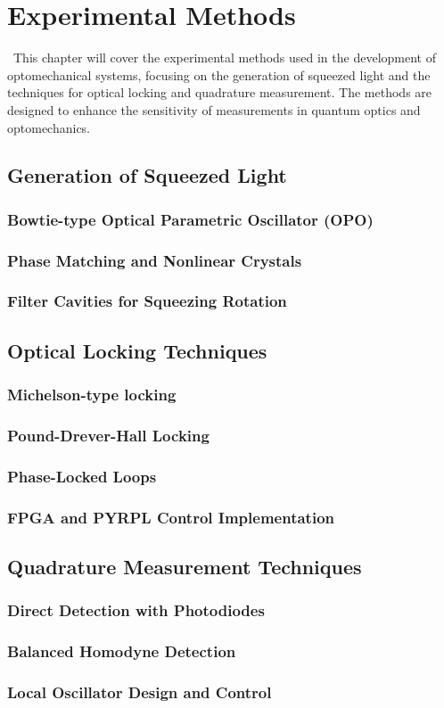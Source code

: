 
\chapter{Experimental Methods}\label{chap:cooling}
\etocsettocstyle{\section*{\contentsname}}{}
\localtableofcontents\
This chapter will cover the experimental methods used in the development of optomechanical systems, focusing on the generation of squeezed light and the techniques for optical locking and quadrature measurement. The methods are designed to enhance the sensitivity of measurements in quantum optics and optomechanics.
\section{Generation of Squeezed Light}
\subsection{Bowtie-type Optical Parametric Oscillator (OPO)}
\subsection{Phase Matching and Nonlinear Crystals}
\subsection{Filter Cavities for Squeezing Rotation}
\section{Optical Locking Techniques}
\subsection{Michelson-type locking}
\subsection{Pound-Drever-Hall Locking}
\subsection{Phase-Locked Loops}
\subsection{FPGA and PYRPL Control Implementation}
\section{Quadrature Measurement Techniques}
\subsection{Direct Detection with Photodiodes}
\subsection{Balanced Homodyne Detection}
\subsection{Local Oscillator Design and Control}
